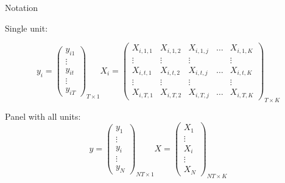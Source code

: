 \documentclass{beamer}
\begin{document}
\begin{frame}{Notation}

\footnotesize

Single unit:

\[ y_i = \left( \begin{array}{c}
y_{i1} \\
\vdots \\
y_{it} \\
\vdots \\
y_{iT}
\end{array} \right)_{T\times 1}
%
X_i = \left( \begin{array}{ccccc}
X_{i,1,1} & X_{i,1,2} & X_{i,1,j} & \dots & X_{i,1,K} \\
\vdots & \vdots & \vdots & & \vdots \\
X_{i,t,1} & X_{i,t,2} & X_{i,t,j} & \dots & X_{i,t,K} \\
\vdots & \vdots & \vdots & & \vdots \\
X_{i,T,1} & X_{i,T,2} & X_{i,T,j} & \dots & X_{i,T,K} 
\end{array} \right)_{T\times K}
\]

Panel with all units:
\[ y = \left( \begin{array}{c}
y_{1} \\
\vdots \\
y_{i} \\
\vdots \\
y_{N}
\end{array} \right)_{NT\times 1}
%
X = \left( \begin{array}{c}
X_1  \\
\vdots \\
X_i \\
\vdots \\
X_N
\end{array} \right)_{NT \times K}
\]


\end{frame}
\end{document}
